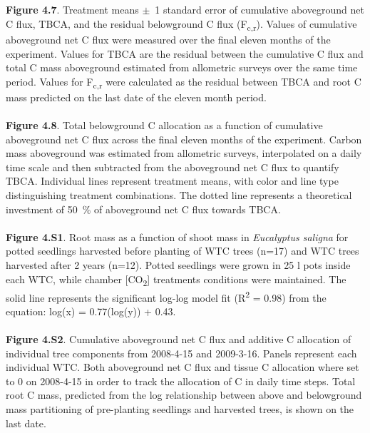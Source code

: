 \documentclass[a4paper]{article}
\begin{document}
\\
\\
\textbf{Figure 4.7}. Treatment means $\pm$~1 standard error of cumulative aboveground net C flux, TBCA, and the residual belowground C flux (F\textsubscript{c,r}). Values of cumulative aboveground net C flux were measured over the final eleven months of the experiment. Values for TBCA are the residual between the cumulative C flux and total C mass aboveground estimated from allometric surveys over the same time period. Values for F\textsubscript{c,r} were calculated as the residual between TBCA and root C mass predicted on the last date of the eleven month period. 
\\
\\
\textbf{Figure 4.8}. Total belowground C allocation as a function of cumulative aboveground net C flux across the final eleven months of the experiment. Carbon mass aboveground was estimated from allometric surveys, interpolated on a daily time scale and then subtracted from the aboveground net C flux to quantify TBCA. Individual lines represent treatment means, with color and line type distinguishing treatment combinations. The dotted line represents a theoretical investment of 50~\% of aboveground net C flux towards TBCA.
\\
\\
\textbf{Figure 4.S1}.
Root mass as a function of shoot mass in \textit{Eucalyptus saligna} for potted seedlings harvested before planting of WTC trees (n=17) and WTC trees harvested after 2 years (n=12). Potted seedlings were grown in 25 l pots inside each WTC, while chamber [CO\textsubscript{2}] treatments conditions were maintained. The solid line represents the significant log-log model fit (R\textsuperscript{2} = 0.98) from the equation: log(x) = 0.77(log(y)) + 0.43.
\\
\\
\textbf{Figure 4.S2}.
Cumulative aboveground net C flux and additive C allocation of individual tree components from 2008-4-15 and 2009-3-16. Panels represent each individual WTC. Both aboveground net C flux and tissue C allocation where set to 0 on 2008-4-15 in order to track the allocation of C in daily time steps. Total root C mass, predicted from the log relationship between above and belowground mass partitioning of pre-planting seedlings and harvested trees, is shown on the last date.

\clearpage
\end{document}
